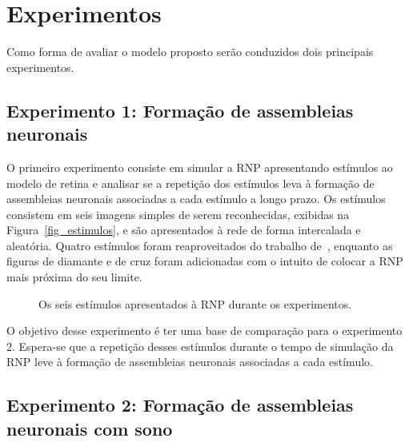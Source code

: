 \section{Experimentos}\label{section_experimento}

Como forma de avaliar o modelo proposto serão conduzidos dois principais experimentos.

\subsection{Experimento 1: Formação de assembleias neuronais}

O primeiro experimento consiste em simular a RNP apresentando estímulos ao modelo de retina e analisar se a repetição dos
estímulos leva à formação de assembleias neuronais associadas a cada estímulo a longo prazo. Os estímulos consistem em seis
imagens simples de serem reconhecidas, exibidas na Figura~\ref{fig_estimulos}, e são apresentados à rede de forma intercalada e
aleatória. Quatro estímulos foram reaproveitados do trabalho de~, enquanto as figuras de diamante e
de cruz foram adicionadas com o intuito de colocar a RNP mais próxima do seu limite.

\begin{figure}[!ht]
\caption{Os seis estímulos apresentados à RNP durante os experimentos.}
\end{figure}

O objetivo desse experimento é ter uma base de comparação para o experimento 2. Espera-se que a repetição desses
estímulos durante o tempo de simulação da RNP leve à formação de assembleias neuronais associadas a cada estímulo.

\subsection{Experimento 2: Formação de assembleias neuronais com sono}

